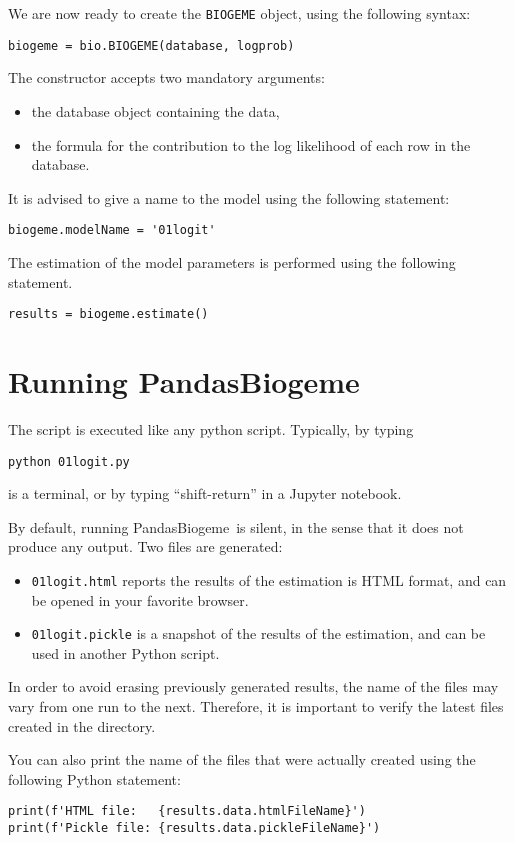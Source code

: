\documentclass[12pt,a4paper]{article}
\newcommand{\PDBIOGEME}{PandasBiogeme}
\begin{document}
We are now ready to create the \lstinline+BIOGEME+ object, using the
following syntax:
\begin{lstlisting}
biogeme = bio.BIOGEME(database, logprob)
\end{lstlisting}
The constructor accepts two mandatory arguments:
\begin{itemize}
\item the database object containing the data,
\item the formula for the contribution to the log likelihood of each
  row in the database. 
\end{itemize}
It is advised to give a name to the model using the following
statement:
\begin{lstlisting}
biogeme.modelName = '01logit'
\end{lstlisting}

The estimation of the model parameters is performed using the
following statement. 

\begin{lstlisting}
results = biogeme.estimate()
\end{lstlisting}


\section{Running \PDBIOGEME}

The script is executed like any python script. Typically, by typing
\begin{lstlisting}
python 01logit.py
\end{lstlisting}
is a terminal, or by typing ``shift-return'' in a Jupyter notebook.

By default, running \PDBIOGEME\ is silent, in the sense that it does
not produce any output. 
Two files are generated:
\begin{itemize}
\item \lstinline+01logit.html+ reports the results of the estimation
  is HTML format, and can be opened in your favorite browser. 
\item \lstinline+01logit.pickle+ is a snapshot of the results of the
estimation, and can be used in another Python script. 
\end{itemize}

In order to avoid erasing previously generated results, the name of
the files may vary from one run to the next. Therefore,
it is important to verify the latest files created in the directory. 

You can also print the name of the files that were actually
created using the following Python statement:
\begin{lstlisting}
print(f'HTML file:   {results.data.htmlFileName}')
print(f'Pickle file: {results.data.pickleFileName}')
\end{lstlisting}
\clearpage
\end{document}
